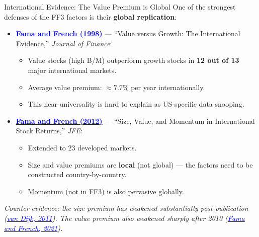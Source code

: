 \documentclass{beamer}
\begin{document}
\begin{frame}{International Evidence: The Value Premium is Global}
	One of the strongest defenses of the FF3 factors is their \textbf{global replication}:
	\vspace{4pt}
	\begin{itemize}
		\item \textbf{\href{https://doi.org/10.1111/0022-1082.00073}{\textcolor{blue}{Fama and French (1998)}}} --- ``Value versus Growth: The International Evidence,'' \textit{Journal of Finance}:
		\begin{itemize}
			\item Value stocks (high B/M) outperform growth stocks in \textbf{12 out of 13} major international markets.
			\item Average value premium: $\approx 7.7\%$ per year internationally.
			\item This near-universality is hard to explain as US-specific data snooping.
		\end{itemize}
		\item \textbf{\href{https://doi.org/10.1111/j.1540-6261.2012.01802.x}{\textcolor{blue}{Fama and French (2012)}}} --- ``Size, Value, and Momentum in International Stock Returns,'' \textit{JFE}:
		\begin{itemize}
			\item Extended to 23 developed markets.
			\item Size and value premiums are \textbf{local} (not global) --- the factors need to be constructed country-by-country.
			\item Momentum (not in FF3) is also pervasive globally.
		\end{itemize}
	\end{itemize}
	\vspace{4pt}
	\footnotesize \textit{Counter-evidence: the size premium has weakened substantially post-publication (\href{https://doi.org/10.1111/jofi.12931}{\textcolor{blue}{van Dijk, 2011}}). The value premium also weakened sharply after 2010 (\href{https://doi.org/10.1016/j.jfineco.2021.06.003}{\textcolor{blue}{Fama and French, 2021}}).}
\end{frame}
\end{document}
